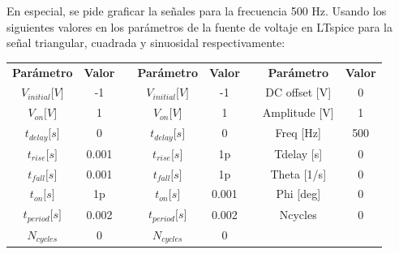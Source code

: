 \documentclass[letterpaper,11pt]{article} %
\begin{document}
En especial, se pide graficar la señales para la frecuencia 500 Hz. Usando los siguientes valores en los parámetros de la fuente de voltaje en LTspice para la señal triangular, cuadrada y sinuosidal respectivamente:
\begin{center}
    \begin{tabular}{|c|c|c|c|c|ccc}
\cline{1-2} \cline{4-5} \cline{7-8}
\textbf{Parámetro}   & \textbf{Valor} &  & \textbf{Parámetro}   & \textbf{Valor} & \multicolumn{1}{c|}{} & \multicolumn{1}{c|}{\textbf{Parámetro}} & \multicolumn{1}{c|}{\textbf{Valor}} \\ \cline{1-2} \cline{4-5} \cline{7-8} 
$V_{initial}{[}V{]}$ & -1             &  & $V_{initial}{[}V{]}$ & -1             & \multicolumn{1}{c|}{} & \multicolumn{1}{c|}{DC offset {[}V{]}}  & \multicolumn{1}{c|}{0}              \\ \cline{1-2} \cline{4-5} \cline{7-8} 
$V_{on}{[}V{]}$      & 1              &  & $V_{on}{[}V{]}$      & 1              & \multicolumn{1}{c|}{} & \multicolumn{1}{c|}{Amplitude {[}V{]}}  & \multicolumn{1}{c|}{1}              \\ \cline{1-2} \cline{4-5} \cline{7-8} 
$t_{delay}{[}s{]}$   & 0              &  & $t_{delay}{[}s{]}$   & 0              & \multicolumn{1}{c|}{} & \multicolumn{1}{c|}{Freq {[}Hz{]}}      & \multicolumn{1}{c|}{500}            \\ \cline{1-2} \cline{4-5} \cline{7-8} 
$t_{rise}{[}s{]}$    & 0.001          &  & $t_{rise}{[}s{]}$    & 1p             & \multicolumn{1}{c|}{} & \multicolumn{1}{c|}{Tdelay {[}s{]}}     & \multicolumn{1}{c|}{0}              \\ \cline{1-2} \cline{4-5} \cline{7-8} 
$t_{fall}{[}s{]}$    & 0.001          &  & $t_{fall}{[}s{]}$    & 1p             & \multicolumn{1}{c|}{} & \multicolumn{1}{c|}{Theta {[}1/s{]}}    & \multicolumn{1}{c|}{0}              \\ \cline{1-2} \cline{4-5} \cline{7-8} 
$t_{on}{[}s{]}$      & 1p             &  & $t_{on}{[}s{]}$      & 0.001          & \multicolumn{1}{c|}{} & \multicolumn{1}{c|}{Phi {[}deg{]}}      & \multicolumn{1}{c|}{0}              \\ \cline{1-2} \cline{4-5} \cline{7-8} 
$t_{period}{[}s{]}$  & 0.002          &  & $t_{period}{[}s{]}$  & 0.002          & \multicolumn{1}{c|}{} & \multicolumn{1}{c|}{Ncycles}            & \multicolumn{1}{c|}{0}              \\ \cline{1-2} \cline{4-5} \cline{7-8} 
$N_{cycles}$         & 0              &  & $N_{cycles}$         & 0              &                       &                                         &                                     \\ \cline{1-2} \cline{4-5}
\end{tabular}
\end{center}
\end{document}
